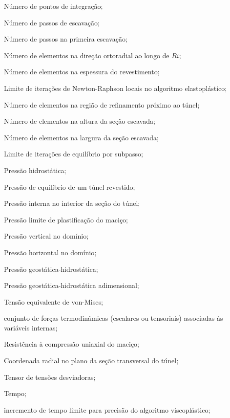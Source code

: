 \item[$n_p$] 				Número de pontos de integração;
\item[$n_p$] 				Número de passos de escavação;
\item[$n_{p_1}$] 				Número de passos na primeira escavação;
\item[$nR_{i}$] 				Número de elementos na direção ortoradial ao longo de $Ri$;
\item[$n_{rev}$] 				Número de elementos na espessura do revestimento;
\item[$nr_{max}$] 				Limite de iterações de Newton-Raphson locais no algoritmo elastoplástico;
\item[$nR_{1}$] 				Número de elementos na região de refinamento próximo ao túnel;
\item[$nR_{v}$] 				Número de elementos na altura da seção escavada;
\item[$nR_{h}$] 				Número de elementos na largura da seção escavada;
\item[$n_{eqit}$] 				Limite de iterações de equilíbrio por subpasso;
\item[$ p $]			Pressão hidrostática;
\item[$ p_{eq} $] 		Pressão de equilíbrio de um túnel revestido;
\item[$ p_i $]			Pressão interna no interior da seção do túnel;
\item[$ p_{lim} $] 		Pressão limite de plastificação do maciço;
\item[$ p_{v} $] 		Pressão vertical no domínio;
\item[$ p_{h} $] 		Pressão horizontal no domínio;
\item[$ p_\infty $]		Pressão geostática-hidrostática;
\item[$ p_\infty^* $]	Pressão geostática-hidrostática adimensional;
\item[$ q $]	Tensão equivalente de von-Mises;
\item[$\ql$] conjunto de forças termodinâmicas (escalares ou tensoriais) associadas às variáveis internas;
\item[$ q_0 $] 			Resistência à compressão uniaxial do maciço;
\item[$ r $]			Coordenada radial no plano da seção transversal do túnel;
\item[$ \sll $]			Tensor de tensões desviadoras;
\item[$ t $] 			Tempo;
\item[$ \Delta t_{min} $] 	 incremento de tempo limite para precisão do algoritmo viscoplástico;
